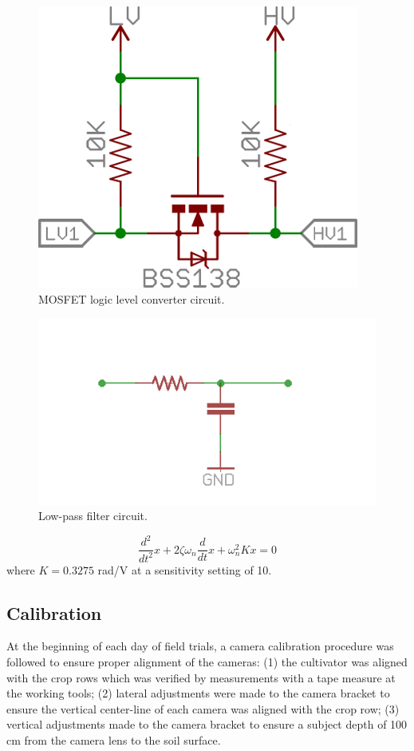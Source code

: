 \documentclass[authoryear]{elsarticle}
\begin{document}
\begin{figure}
  \centering
  \includegraphics[scale=0.3,natwidth=610,natheight=642]{mosfet.png}
  \caption{MOSFET logic level converter circuit.}
  \label{fig:mosfet}
\end{figure}

\begin{figure}
  \centering
  \includegraphics[scale=0.3,natwidth=610,natheight=642]{lowpass.png}
  \caption{Low-pass filter circuit.}
  \label{fig:lowpass}
\end{figure}

\begin{equation}
  \frac{d^2}{dt^2}x + 2\zeta\omega_{n}\frac{d}{dt}x + \omega_{n}^2 Kx = 0 
  \label{eq:v_out}
\end{equation}
where $K=0.3275$ rad/V at a sensitivity setting of 10.

\subsection{Calibration}
At the beginning of each day of field trials, a camera calibration
procedure was followed to ensure proper alignment of the cameras: (1)
the cultivator was aligned with the crop rows which was verified by
measurements with a tape measure at the working tools; (2) lateral
adjustments were made to the camera bracket to ensure the vertical
center-line of each camera was aligned with the crop row; (3) vertical
adjustments made to the camera bracket to ensure a subject depth of
100 cm from the camera lens to the soil surface.
\end{document}
